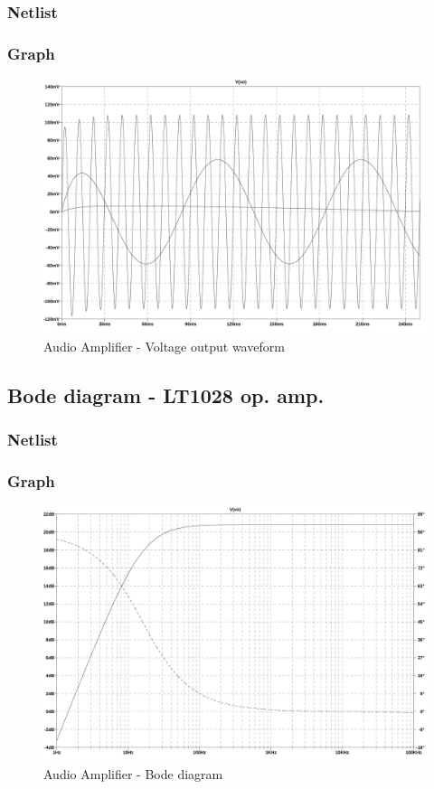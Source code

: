 \documentclass[10pt,a4paper]{article}
\begin{document}
\subsubsection{Netlist}


\subsubsection{Graph}
\begin{figure}[H]
  \centering
  \includegraphics[width=14cm]{graph/1d2.jpg}
  \caption{Audio Amplifier - Voltage output waveform}
  \label{1d2graph}
\end{figure}

\subsection{Bode diagram - LT1028 op. amp.}
\subsubsection{Netlist}


\subsubsection{Graph}
\begin{figure}[H]
  \centering
  \includegraphics[width=14cm]{graph/1d3.jpg}
  \caption{Audio Amplifier - Bode diagram}
  \label{1d3graph}
\end{figure}
\end{document}
